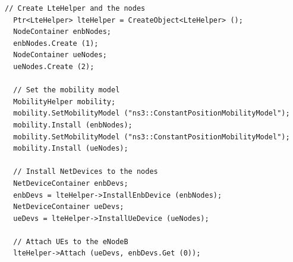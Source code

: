 \begin{lstlisting}[language=myC++,caption={LteHelper usage}, captionpos=b]
  // Create LteHelper and the nodes
  Ptr<LteHelper> lteHelper = CreateObject<LteHelper> ();
  NodeContainer enbNodes;
  enbNodes.Create (1);
  NodeContainer ueNodes;
  ueNodes.Create (2);

  // Set the mobility model
  MobilityHelper mobility;
  mobility.SetMobilityModel ("ns3::ConstantPositionMobilityModel");
  mobility.Install (enbNodes);
  mobility.SetMobilityModel ("ns3::ConstantPositionMobilityModel");
  mobility.Install (ueNodes);

  // Install NetDevices to the nodes
  NetDeviceContainer enbDevs;
  enbDevs = lteHelper->InstallEnbDevice (enbNodes);
  NetDeviceContainer ueDevs;
  ueDevs = lteHelper->InstallUeDevice (ueNodes);  

  // Attach UEs to the eNodeB
  lteHelper->Attach (ueDevs, enbDevs.Get (0));
\end{lstlisting}


